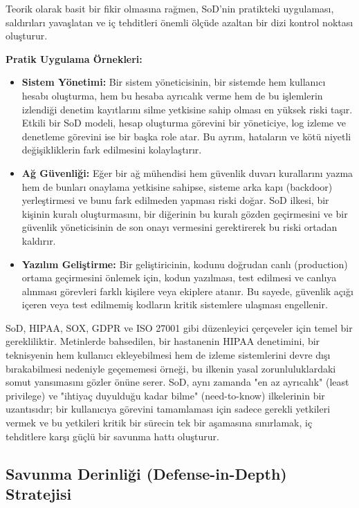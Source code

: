 Teorik olarak basit bir fikir olmasına rağmen, SoD'nin pratikteki uygulaması, saldırıları yavaşlatan ve iç tehditleri önemli ölçüde azaltan bir dizi kontrol noktası oluşturur.

\textbf{Pratik Uygulama Örnekleri:}

\begin{itemize}
    \item \textbf{Sistem Yönetimi:} Bir sistem yöneticisinin, bir sistemde hem kullanıcı hesabı oluşturma, hem bu hesaba ayrıcalık verme hem de bu işlemlerin izlendiği denetim kayıtlarını silme yetkisine sahip olması en yüksek riski taşır. Etkili bir SoD modeli, hesap oluşturma görevini bir yöneticiye, log izleme ve denetleme görevini ise bir başka role atar. Bu ayrım, hataların ve kötü niyetli değişikliklerin fark edilmesini kolaylaştırır.
    \item \textbf{Ağ Güvenliği:} Eğer bir ağ mühendisi hem güvenlik duvarı kurallarını yazma hem de bunları onaylama yetkisine sahipse, sisteme arka kapı (backdoor) yerleştirmesi ve bunu fark edilmeden yapması riski doğar. SoD ilkesi, bir kişinin kuralı oluşturmasını, bir diğerinin bu kuralı gözden geçirmesini ve bir güvenlik yöneticisinin de son onayı vermesini gerektirerek bu riski ortadan kaldırır.
    \item \textbf{Yazılım Geliştirme:} Bir geliştiricinin, kodunu doğrudan canlı (production) ortama geçirmesini önlemek için, kodun yazılması, test edilmesi ve canlıya alınması görevleri farklı kişilere veya ekiplere atanır. Bu sayede, güvenlik açığı içeren veya test edilmemiş kodların kritik sistemlere ulaşması engellenir.
\end{itemize}

SoD, HIPAA, SOX, GDPR ve ISO 27001 gibi düzenleyici çerçeveler için temel bir gerekliliktir. Metinlerde bahsedilen, bir hastanenin HIPAA denetimini, bir teknisyenin hem kullanıcı ekleyebilmesi hem de izleme sistemlerini devre dışı bırakabilmesi nedeniyle geçememesi örneği, bu ilkenin yasal zorunluluklardaki somut yansımasını gözler önüne serer. SoD, aynı zamanda "en az ayrıcalık" (least privilege) ve "ihtiyaç duyulduğu kadar bilme" (need-to-know) ilkelerinin bir uzantısıdır; bir kullanıcıya görevini tamamlaması için sadece gerekli yetkileri vermek ve bu yetkileri kritik bir sürecin tek bir aşamasına sınırlamak, iç tehditlere karşı güçlü bir savunma hattı oluşturur.

\subsection{Savunma Derinliği (Defense-in-Depth) Stratejisi}


